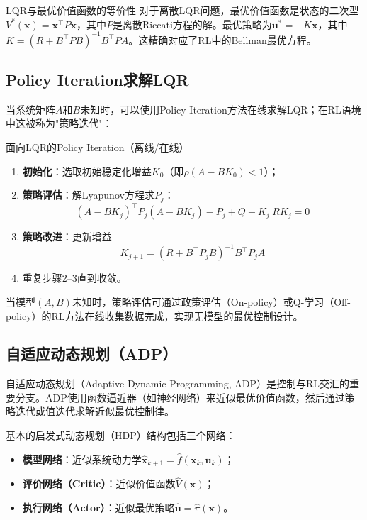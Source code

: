 \begin{myTheorem}{LQR与最优价值函数的等价性}
对于离散LQR问题，最优价值函数是状态的二次型\(V^*(\mathbf{x}) = \mathbf{x}^{\top}P\mathbf{x}\)，其中\(P\)是离散Riccati方程的解。最优策略为\(\mathbf{u}^* = -K\mathbf{x}\)，其中\(K = (R + B^{\top}PB)^{-1}B^{\top}PA\)。这精确对应了RL中的Bellman最优方程。
\end{myTheorem}

\subsection{Policy Iteration求解LQR}

当系统矩阵\(A\)和\(B\)未知时，可以使用Policy Iteration方法在线求解LQR；在RL语境中这被称为"策略迭代"：

\begin{myalgorithm}{面向LQR的Policy Iteration（离线/在线）}
\begin{enumerate}
\item \textbf{初始化}：选取初始稳定化增益\(K_0\)（即\(\rho(A - BK_0) < 1\)）；
\item \textbf{策略评估}：解Lyapunov方程求\(P_j\)：
\[
(A - BK_j)^{\top}P_j(A - BK_j) - P_j + Q + K_j^{\top}RK_j = 0
\]
\item \textbf{策略改进}：更新增益
\[
K_{j+1} = (R + B^{\top}P_j B)^{-1}B^{\top}P_j A
\]
\item 重复步骤2--3直到收敛。
\end{enumerate}
\end{myalgorithm}

当模型\((A,B)\)未知时，策略评估可通过政策评估（On-policy）或Q-学习（Off-policy）的RL方法在线收集数据完成，实现无模型的最优控制设计。

\subsection{自适应动态规划（ADP）}

自适应动态规划（Adaptive Dynamic Programming, ADP）是控制与RL交汇的重要分支。ADP使用函数逼近器（如神经网络）来近似最优价值函数，然后通过策略迭代或值迭代求解近似最优控制律。

基本的启发式动态规划（HDP）结构包括三个网络：
\begin{itemize}
\item \textbf{模型网络}：近似系统动力学\(\hat{\mathbf{x}}_{k+1} = \hat{f}(\mathbf{x}_k, \mathbf{u}_k)\)；
\item \textbf{评价网络（Critic）}：近似价值函数\(\hat{V}(\mathbf{x})\)；
\item \textbf{执行网络（Actor）}：近似最优策略\(\hat{\mathbf{u}} = \hat{\pi}(\mathbf{x})\)。
\end{itemize}

